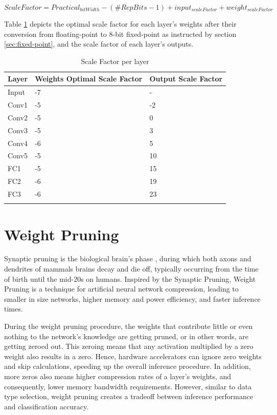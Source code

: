 \begin{equation}
	\label{eqn:activations-scale-factor}
	ScaleFactor = Practical_{bitWidth} - (\#RepBits - 1) + input_{scaleFactor} + weight_{scaleFactor}
\end{equation}

Table \ref{tab:Scale-Factor-per-layer} depicts the optimal scale factor for each layer's weights after their conversion from floating-point to 8-bit fixed-point as instructed by section \ref{sec:fixed-point}, and the scale factor of each layer's outputs.

\begin{table}[H]
	\caption{Scale Factor per layer}
	\label{tab:Scale-Factor-per-layer}
	\centering
	\begin{tabular}{lll}
		\toprule
		\textbf{Layer} & \textbf{Weights Optimal Scale Factor} & \textbf{Output Scale Factor}\\
		\midrule
			Input & -7 & -\\
			Conv1 & -5 & -2\\
			Conv2 & -5 & 0\\
			Conv3 & -5 & 3\\
			Conv4 & -6 & 5\\
			Conv5 & -5 & 10\\
			FC1 & -5 & 15\\
			FC2 & -6 & 19\\
			FC3 & -6 & 23\\
		\bottomrule\\
	\end{tabular}
\end{table}

\section{Weight Pruning}
Synaptic pruning is the biological brain's phase \cite{Synaptic-Pruning-Wikipedia}, during which both axons and dendrites of mammals brains decay and die off, typically occurring from the time of birth until the mid-20s on humans. Inspired by the Synaptic Pruning, Weight Pruning is a technique for artificial neural network compression, leading to smaller in size networks, higher memory and power efficiency, and faster inference times.

During the weight pruning procedure, the weights that contribute little or even nothing to the network's knowledge are getting pruned, or in other words, are getting zeroed out. This zeroing means that any activation multiplied by a zero weight also results in a zero. Hence, hardware accelerators can ignore zero weights and skip calculations, speeding up the overall inference procedure. In addition, more zeros also means higher compression rates of a layer's weights, and consequently, lower memory bandwidth requirements. However, similar to data type selection, weight pruning creates a tradeoff between inference performance and classification accuracy.

